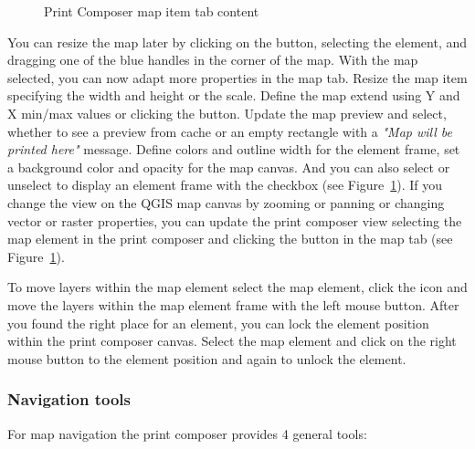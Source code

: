 \begin{figure}[ht]
\centering
\caption{Print Composer map item tab content \nixcaption}\label{fig:print_composer_map_item}
   \goodgap
\end{figure}

You can resize the map later by clicking on the
 button, selecting the
element, and dragging one of the blue handles in the corner of the map. With
the map selected, you can now adapt more properties in the map 
tab. Resize the map item specifying the width and height or the scale. Define
the map extend using Y and X min/max values or clicking the  button. Update the map preview and select, whether to see
a preview from cache or an empty rectangle with a \textit{"Map will be
printed here"} message. Define colors and outline width for the element
frame, set a background color and opacity for the map canvas. And you can
also select or unselect to display an element frame with the 
checkbox (see Figure~\ref{fig:print_composer_map_item}). If you change the
view on the QGIS map canvas by zooming or panning or changing vector or
raster properties, you can update the print composer view selecting the map
element in the print composer and clicking the  button
in the map  tab (see Figure~\ref{fig:print_composer_map_item}). 

To move layers within the map element select the map element, click 
the  icon 
and move the layers within the map element frame with the left mouse button.
After you found the right place for an element, you can lock the element
position within the print composer canvas. Select the map element and click
on the right mouse button to  the element
position and again to unlock the element.

\subsubsection{Navigation tools}

For map navigation the print composer provides 4 general tools:

